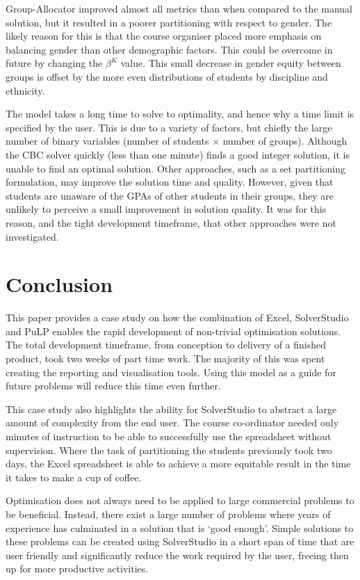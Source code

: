 \documentclass[12pt]{ORSNZ}
\begin{document}
Group-Allocator improved almost all metrics than when compared to the manual solution, but it resulted in a poorer partitioning with respect to gender. The likely reason for this is that the course organiser placed more emphasis on balancing gender than other demographic factors. This could be overcome in future by changing the $\beta^K$ value. This small decrease in gender equity between groups is offset by the more even distributions of students by discipline and ethnicity.

The model takes a long time to solve to optimality, and hence why a time limit is specified by the user. This is due to a variety of factors, but chiefly the large number of binary variables (number of students $\times$ number of groups). Although the CBC solver quickly (less than one minute) finds a good integer solution, it is unable to find an optimal solution. Other approaches, such as a set partitioning formulation, may improve the solution time and quality. However, given that students are unaware of the GPAs of other students in their groups, they are unlikely to perceive a small improvement in solution quality. It was for this reason, and the tight development timeframe, that other approaches were not investigated.

\section{Conclusion}
This paper provides a case study on how the combination of Excel, SolverStudio and PuLP enables the rapid development of non-trivial optimisation solutions. The total development timeframe, from conception to delivery of a finished product, took two weeks of part time work. The majority of this was spent creating the reporting and visualisation tools. Using this model as a guide for future problems will reduce this time even further.

This case study also highlights the ability for SolverStudio to abstract a large amount of complexity from the end user. The course co-ordinator needed only minutes of instruction to be able to successfully use the spreadsheet without supervision. Where the task of partitioning the students previously took two days, the Excel spreadsheet is able to achieve a more equitable result in the time it takes to make a cup of coffee.

Optimisation does not always need to be applied to large commercial problems to be beneficial. Instead, there exist a large number of problems where years of experience has culminated in a solution that is `good enough'. Simple solutions to these problems can be created using SolverStudio in a short span of time that are user friendly and significantly reduce the work required by the user, freeing then up for more productive activities.
\end{document}
